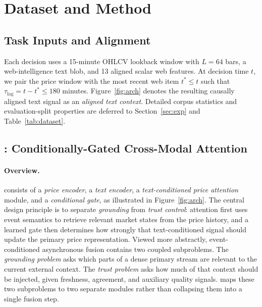 \section{Dataset and Method}
\label{sec:method}

\subsection{Task Inputs and Alignment}
Each decision uses a 15-minute OHLCV lookback window with $L=64$ bars, a web-intelligence text blob, and 13 aligned scalar web features.
At decision time $t$, we pair the price window with the most recent web item $t^* \leq t$ such that $\tau_{\mathrm{lag}} = t - t^* \leq 180$ minutes.
Figure~\ref{fig:arch} denotes the resulting causally aligned text signal as an \emph{aligned text context}.
Detailed corpus statistics and evaluation-split properties are deferred to Section~\ref{sec:exp} and Table~\ref{tab:dataset}.

\subsection{\CGCMA{}: Conditionally-Gated Cross-Modal Attention}
\label{sec:cgcma}

\paragraph{Overview.}
\CGCMA{} consists of a \emph{price encoder}, a \emph{text encoder}, a \emph{text-conditioned price attention} module, and a \emph{conditional gate}, as illustrated in Figure~\ref{fig:arch}.
The central design principle is to separate \emph{grounding} from \emph{trust control}: attention first uses event semantics to retrieve relevant market states from the price history, and a learned gate then determines how strongly that text-conditioned signal should update the primary price representation.
Viewed more abstractly, event-conditioned asynchronous fusion contains two coupled subproblems.
The \emph{grounding problem} asks which parts of a dense primary stream are relevant to the current external context.
The \emph{trust problem} asks how much of that context should be injected, given freshness, agreement, and auxiliary quality signals.
\CGCMA{} maps these two subproblems to two separate modules rather than collapsing them into a single fusion step.

